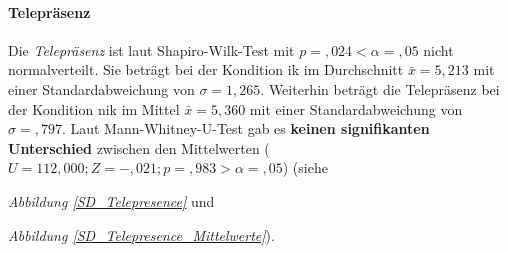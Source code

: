 \documentclass[a4paper,11pt]{article}%
\renewcommand{\\}{\vspace*{0.5\baselineskip} \newline}
\begin{document}
{{{{{{{{{{{{{{{{{{\newpage

\paragraph{Telepräsenz} 
Die \textit{Telepräsenz} ist laut Shapiro-Wilk-Test mit $p =,024 < \alpha = ,05$ nicht normalverteilt. 
Sie beträgt bei der Kondition \ac{ik} im Durchschnitt $\bar{x} = 5,213$ mit einer Standardabweichung von $\sigma = 1,265$.
Weiterhin beträgt die Telepräsenz bei der Kondition \ac{nik} im Mittel $\bar{x} = 5,360$ mit einer Standardabweichung von $\sigma =,797$. 
Laut Mann-Whitney-U-Test gab es \textbf{keinen signifikanten Unterschied} zwischen den Mittelwerten ($U = 112,000; Z = -,021; p =,983 > \alpha = ,05$) (siehe {\textit{Abbildung \ref{SD_Telepresence}} und {\textit{Abbildung \ref{SD_Telepresence_Mittelwerte}}).

}}}}}}}}}}}}}}}}}}}}
\end{document}
